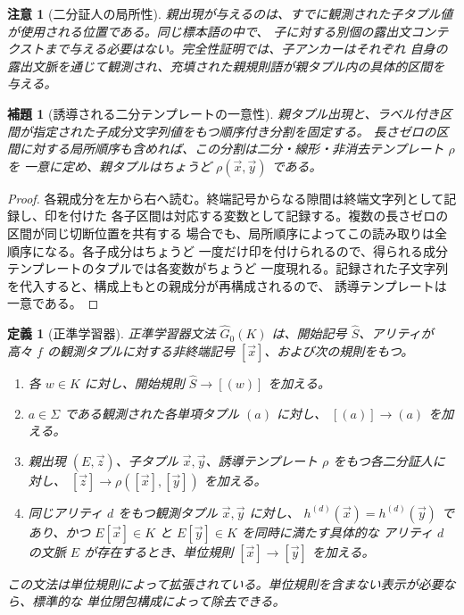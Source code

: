 \documentclass[11pt,a4paper]{ltjsarticle}
\newtheorem{lemma}[theorem]{補題}
\newtheorem{definition}[theorem]{定義}
\newtheorem{remark}[theorem]{注意}
\theoremstyle{remark}
\newcommand{\tuple}[1]{\vec{#1}}
\begin{document}
\begin{remark}[二分証人の局所性]
\label{rem:binary-witness-locality}
親出現が与えるのは、すでに観測された子タプル値が使用される位置である。同じ標本語の中で、
子に対する別個の露出文コンテクストまで与える必要はない。完全性証明では、子アンカーはそれぞれ
自身の露出文脈を通じて観測され、充填された親規則語が親タプル内の具体的区間を与える。
\end{remark}

\begin{lemma}[誘導される二分テンプレートの一意性]
\label{lem:unique-induced-template}
親タプル出現と、ラベル付き区間が指定された子成分文字列値をもつ順序付き分割を固定する。
長さゼロの区間に対する局所順序も含めれば、この分割は二分・線形・非消去テンプレート \(\rho\) を
一意に定め、親タプルはちょうど \(\rho(\tuple x,\tuple y)\) である。
\end{lemma}

\begin{proof}
各親成分を左から右へ読む。終端記号からなる隙間は終端文字列として記録し、印を付けた
各子区間は対応する変数として記録する。複数の長さゼロの区間が同じ切断位置を共有する
場合でも、局所順序によってこの読み取りは全順序になる。各子成分はちょうど
一度だけ印を付けられるので、得られる成分テンプレートのタプルでは各変数がちょうど
一度現れる。記録された子文字列を代入すると、構成上もとの親成分が再構成されるので、
誘導テンプレートは一意である。
\end{proof}

\begin{definition}[正準学習器]
\label{def:learner}
正準学習器文法 \(\widehat G_0(K)\) は、開始記号 \(\widehat S\)、アリティが高々
\(f\) の観測タプルに対する非終端記号 \([\tuple x]\)、および次の規則をもつ。
\begin{enumerate}[label=(\roman*),leftmargin=*]
\item 各 \(w\in K\) に対し、開始規則 \(\widehat S\to[(w)]\) を加える。
\item \(a\in\Sigma\) である観測された各単項タプル \((a)\) に対し、
\([(a)]\to(a)\) を加える。
\item 親出現 \((E,\tuple z)\)、子タプル \(\tuple x,\tuple y\)、誘導テンプレート
\(\rho\) をもつ各二分証人に対し、
\([\tuple z]\to\rho([\tuple x],[\tuple y])\) を加える。
\item 同じアリティ \(d\) をもつ観測タプル \(\tuple x,\tuple y\) に対し、
\(h^{(d)}(\tuple x)=h^{(d)}(\tuple y)\) であり、かつ
\(E[\tuple x]\in K\) と \(E[\tuple y]\in K\) を同時に満たす具体的な
アリティ \(d\) の文脈 \(E\) が存在するとき、単位規則
\([\tuple x]\to[\tuple y]\) を加える。
\end{enumerate}
この文法は単位規則によって拡張されている。単位規則を含まない表示が必要なら、標準的な
単位閉包構成によって除去できる。
\end{definition}
\end{document}
